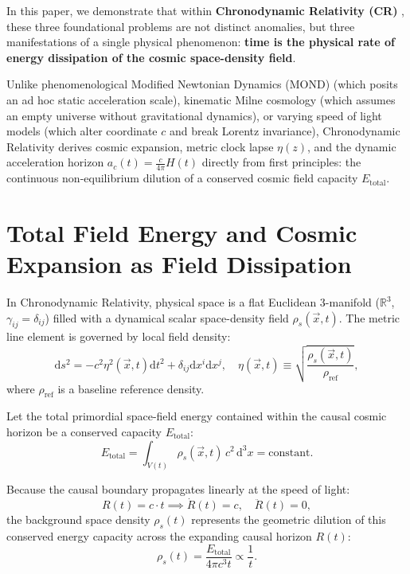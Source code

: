 \documentclass[aps,prd,reprint,superscriptaddress,nofootinbib,floatfix,amsmath,amssymb]{revtex4-2}
\begin{document}
In this paper, we demonstrate that within \textbf{Chronodynamic Relativity (CR)} \cite{Shreve2026_CR_Foundations}, these three foundational problems are not distinct anomalies, but three manifestations of a single physical phenomenon: \textbf{time is the physical rate of energy dissipation of the cosmic space-density field}.

Unlike phenomenological Modified Newtonian Dynamics (MOND) \cite{Milgrom1983} (which posits an ad hoc static acceleration scale), kinematic Milne cosmology \cite{Milne1935} (which assumes an empty universe without gravitational dynamics), or varying speed of light models \cite{AlbrechtMagueijo1999} (which alter coordinate $c$ and break Lorentz invariance), Chronodynamic Relativity derives cosmic expansion, metric clock lapse $\eta(z)$, and the dynamic acceleration horizon $a_c(t) = \frac{c}{4\pi}H(t)$ directly from first principles: the continuous non-equilibrium dilution of a conserved cosmic field capacity $E_{\text{total}}$.

\section{Total Field Energy and Cosmic Expansion as Field Dissipation}
\label{sec:field_dissipation}

In Chronodynamic Relativity, physical space is a flat Euclidean 3-manifold ($\mathbb{R}^3$, $\gamma_{ij} = \delta_{ij}$) filled with a dynamical scalar space-density field $\rho_s(\vec{x}, t)$. The metric line element is governed by local field density:
\begin{equation}
\mathrm{d}s^2 = -c^2 \eta^2(\vec{x}, t) \mathrm{d}t^2 + \delta_{ij} \mathrm{d}x^i \mathrm{d}x^j, \quad \eta(\vec{x}, t) \equiv \sqrt{\frac{\rho_s(\vec{x}, t)}{\rho_{\text{ref}}}},
\label{eq:cr_metric}
\end{equation}
where $\rho_{\text{ref}}$ is a baseline reference density.

Let the total primordial space-field energy contained within the causal cosmic horizon be a conserved capacity $E_{\text{total}}$:
\begin{equation}
E_{\text{total}} = \int_{V(t)} \rho_s(\vec{x}, t) \, c^2 \, \mathrm{d}^3x = \text{constant}.
\label{eq:total_energy}
\end{equation}

Because the causal boundary propagates linearly at the speed of light:
\begin{equation}
R(t) = c \cdot t \implies \dot{R}(t) = c, \quad \ddot{R}(t) = 0,
\label{eq:linear_expansion}
\end{equation}
the background space density $\rho_s(t)$ represents the geometric dilution of this conserved energy capacity across the expanding causal horizon $R(t)$:
\begin{equation}
\rho_s(t) = \frac{E_{\text{total}}}{4\pi c^3 t} \propto \frac{1}{t}.
\label{eq:rho_s_cosmic}
\end{equation}
\end{document}

